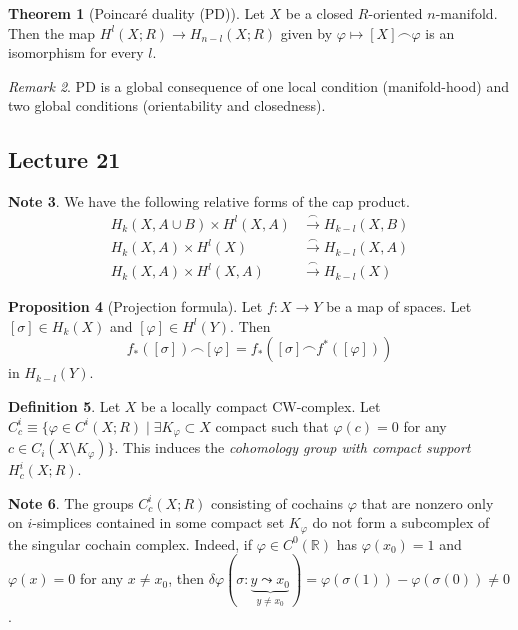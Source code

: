 \documentclass[10pt,letterpaper,cm]{nupset}
\theoremstyle{definition}
\newtheorem{definition}{Definition}[subsection]
\newtheorem{note}[definition]{Note}
\theoremstyle{theorem}
\newtheorem{theorem}[definition]{Theorem}
\newtheorem{prop}[definition]{Proposition}
\theoremstyle{remark}
\newtheorem{remark}[definition]{Remark}
\newcommand{\R}{\mathbb{R}}
\newcommand{\1}{\mathbb{1}}
\newcommand{\0}{\vec 0}
\begin{document}
\begin{theorem}[Poincar\'e duality (PD)]
Let $X$ be a closed $R$-oriented $n$-manifold. Then the map $H^l(X; R) \to H_{n-l}(X;R)$ given by $\varphi \mapsto [X] \frown \varphi$ is an isomorphism for every $l$. 
\end{theorem}

\begin{remark}
PD is a global consequence of one local condition (manifold-hood) and two global conditions (orientability and closedness). 
\end{remark}

\subsection{Lecture 21}

\begin{note}
We have the following relative forms of the cap product.
\begin{align*}
H_k(X, A \cup B) \times H^l(X, A) & \overset{\frown}{\longrightarrow} H_{k-l}(X, B)
 \\ H_k(X, A) \times H^l(X) & \overset{\frown}{\longrightarrow} H_{k-l}(X, A)
 \\  H_k(X, A) \times H^l(X, A) & \overset{\frown}{\longrightarrow} H_{k-l}(X)
\end{align*}
\end{note}

\begin{prop}[Projection formula]
Let $f: X \to Y$ be a map of spaces. Let $[\sigma] \in H_k(X)$ and $[\varphi] \in H^l(Y)$. Then $$f_{\ast}([\sigma]) \frown [\varphi] = f_{\ast}([\sigma] \frown f^{\ast}([\varphi]))    $$ in $H_{k-l}(Y)$.
\end{prop}

\begin{definition}
Let $X$ be a locally compact CW-complex. Let $C_c^i \equiv \{\varphi \in C^i(X; R) \mid \exists K_{\varphi}\subset X$ compact such that $\varphi(c) = 0$ for any $c\in C_i(X \setminus K_{\varphi})\}$. This induces the \textit{cohomology group with compact support} $H^i_c(X; R)$.
\end{definition}

\begin{note}
The groups $C^i_c(X;R)$ consisting of cochains $\varphi$ that are nonzero only on  $i$-simplices contained in some compact set $K_{\varphi}$ do not form a subcomplex of the singular cochain complex. Indeed, if $\varphi \in C^0(\R)$ has $\varphi(x_0) =1$ and $\varphi(x) =0$ for any $x\ne x_0$, then $\delta{\varphi}(\sigma : \underbrace{y \leadsto x_0}_{y\ne x_0}) = \varphi(\sigma(1)) - \varphi(\sigma(0)) \ne 0$.
\end{note}
\end{document}
